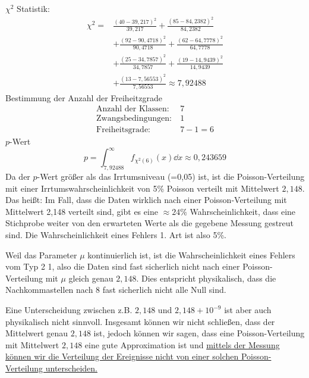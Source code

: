\documentclass[prb,12pt]{revtex4-2}
\theoremstyle{definition}
\theoremstyle{definition}
\begin{document}
$\chi^2$ Statistik:
\begin{align*}
	\chi^2 =& \frac{(40 - 39,217)^2}{39,217}+\frac{(85 - 84,2382)^2}{84,2382}\\
	&+\frac{(92 - 90,4718)^2}{90,4718}+\frac{(62 - 64,7778)^2}{64,7778}\\
	&+\frac{(25 - 34,7857)^2}{34,7857}+\frac{(19 - 14,9439)^2}{14,9439}\\
	&+\frac{(13 - 7,56553)^2}{7,56553}\approx 7,92488
\end{align*}
Bestimmung der Anzahl der Freiheitzgrade
\begin{align*}
\text{Anzahl der Klassen:}&~7\\
\text{Zwangsbedingungen:}&~1\\
\text{Freiheitsgrade:}&~7-1=6
\end{align*}
$p$-Wert
\[p=\int_{7,92488}^\infty f_{\chi^2(6)}(x) \dd{x}\approx 0,243659\]
Da der $p$-Wert größer als das Irrtumsniveau (=0,05) ist, ist die Poisson-Verteilung mit einer Irrtumswahrscheinlichkeit von 5\% Poisson verteilt mit Mittelwert $2,148$. Das heißt: Im Fall, dass die Daten wirklich nach einer Poisson-Verteilung mit Mittelwert 2,148 verteilt sind, gibt es eine $\approx 24\%$ Wahrscheinlichkeit, dass eine Stichprobe weiter von den erwarteten Werte als die gegebene Messung gestreut sind. Die Wahrscheinlichkeit eines Fehlers 1. Art ist also 5\%. 

Weil das Parameter $\mu$ kontinuierlich ist, ist die Wahrscheinlichkeit eines Fehlers vom Typ 2 1, also die Daten sind fast sicherlich nicht nach einer Poisson-Verteilung mit $\mu$ gleich genau $2,148$. Dies entspricht physikalisch, dass die Nachkommastellen nach 8 fast sicherlich nicht alle Null sind. 

Eine Unterscheidung zwischen z.B. $2,148$ und $2,148+ 10^{-9}$ ist aber auch physikalisch nicht sinnvoll. Insgesamt können wir nicht schließen, dass der Mittelwert genau $2,148$ ist, jedoch können wir sagen, dass eine Poisson-Verteilung mit Mittelwert $2,148$ eine gute Approximation ist und \uline{mittels der Messung können wir die Verteilung der Ereignisse nicht von einer solchen Poisson-Verteilung unterscheiden.}
\end{document}
